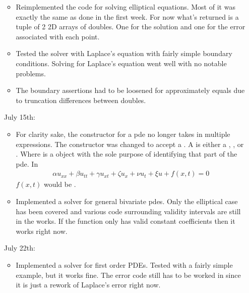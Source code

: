 \documentclass[12pt]{article}
\begin{document}
\begin{itemize}
\begin{itemize}
    \item Reimplemented the code for solving elliptical equations.
        Most of it was exactly the same as done in the first week. For
        now what's returned is a tuple of 2 2D arrays of doubles. One
        for the solution and one for the error associated with each
        point.

    \item Tested the solver with Laplace's equation with fairly simple
        boundary conditions. Solving for Laplace's equation went
        well with no notable problems.  

    \item The boundary assertions had to be loosened for approximately
        equals due to truncation differences between doubles. 
    \end{itemize}
    
\item[July 15th:]\begin{itemize}

    \item For clarity sake, the constructor for a pde no longer takes
        in multiple expressions. The constructor was changed to accept
        a . A  is either a
        , ,  or
        . Where  is a  object 
        with the sole purpose of identifying that part of the pde. In
        \begin{align*}
            \alpha u_{xx}+\beta u_{tt}+\gamma u_{xt}+\zeta u_x + \nu
            u_t + \xi u + f(x, t) = 0
        \end{align*}
        $f(x, t)$ would be .

        
    \item Implemented a solver for general bivariate pdes. Only the
        elliptical case has been covered and various code surrounding
        validity intervals are still in the works. If the function
        only has valid constant coefficients then it works right now. 
    \end{itemize}
\item[July 22th:]\begin{itemize}

    \item Implemented a solver for first order PDEs. Tested with a
        fairly simple example, but it works fine. The error code still
        has to be worked in since it is just a rework of Laplace's
        error right now. 
        

\end{itemize}
\end{itemize}
\end{document}
